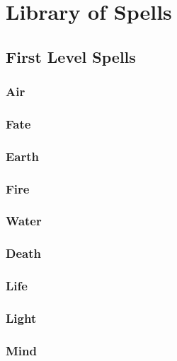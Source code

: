 \chapter{Library of Spells}

\section{First Level Spells}

\begin{multicols}{2}

\subsection{Air}


\subsection{Fate}


\subsection{Earth}


\subsection{Fire}


\subsection{Water}


\subsection{Death}


\subsection{Life}


\subsection{Light}


\subsection{Mind}


\end{multicols}

